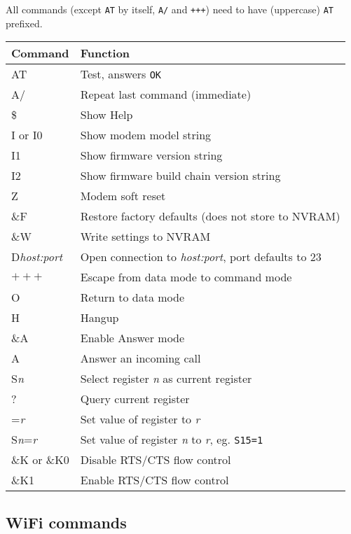 All commands (except \texttt{AT} by itself, \texttt{A/} and \texttt{+++}) need to have (uppercase) \texttt{AT} prefixed.

\begin{tabular}{p{6em} | p{}}
\hline
\textbf{Command} & \textbf{Function} \\
\hline
AT	& Test, answers \texttt{OK} \\
A/	& Repeat last command (immediate) \\
\$	& Show Help \\
I or I0	& Show modem model string \\
I1	& Show firmware version string \\
I2	& Show firmware build chain version string \\
Z	& Modem soft reset \\
\&F	& Restore factory defaults (does not store to NVRAM) \\
\&W & Write settings to NVRAM \\
D\textit{host:port}	& Open connection to \textit{host:port}, port defaults to 23 \\
$+++$	& Escape from data mode to command mode \\
O	& Return to data mode \\
H	& Hangup \\
\&A	& Enable Answer mode \\
A	& Answer an incoming call \\
S\textit{n}	& Select register \textit{n} as current register \\
?	& Query current register \\
=\textit{r}	& Set value of register to \textit{r} \\
S\textit{n}=\textit{r}	& Set value of register \textit{n} to \textit{r}, eg. \texttt{S15=1} \\
\&K or \&K0	& Disable RTS/CTS flow control \\
\&K1		& Enable RTS/CTS flow control \\
\hline
\end{tabular}

\subsection{WiFi commands}

